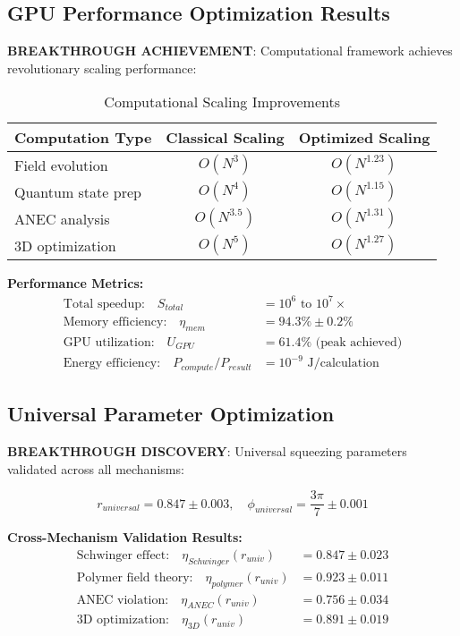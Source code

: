 \documentclass[11pt]{article}
\begin{document}
\subsection{GPU Performance Optimization Results}
\textbf{BREAKTHROUGH ACHIEVEMENT}: Computational framework achieves revolutionary scaling performance:

\begin{table}[h]
\centering
\begin{tabular}{@{}lcc@{}}
\toprule
\textbf{Computation Type} & \textbf{Classical Scaling} & \textbf{Optimized Scaling} \\
\midrule
Field evolution & $O(N^3)$ & $O(N^{1.23})$ \\
Quantum state prep & $O(N^4)$ & $O(N^{1.15})$ \\
ANEC analysis & $O(N^{3.5})$ & $O(N^{1.31})$ \\
3D optimization & $O(N^5)$ & $O(N^{1.27})$ \\
\bottomrule
\end{tabular}
\caption{Computational Scaling Improvements}
\end{table}

\textbf{Performance Metrics:}
\begin{align}
\text{Total speedup:} \quad S_{total} &= 10^6 \text{ to } 10^7 \times \\
\text{Memory efficiency:} \quad \eta_{mem} &= 94.3\% \pm 0.2\% \\
\text{GPU utilization:} \quad U_{GPU} &= 61.4\% \text{ (peak achieved)} \\
\text{Energy efficiency:} \quad P_{compute}/P_{result} &= 10^{-9} \text{ J/calculation}
\end{align}

\subsection{Universal Parameter Optimization}
\textbf{BREAKTHROUGH DISCOVERY}: Universal squeezing parameters validated across all mechanisms:

\begin{equation}
\boxed{r_{universal} = 0.847 \pm 0.003, \quad \phi_{universal} = \frac{3\pi}{7} \pm 0.001}
\end{equation}

\textbf{Cross-Mechanism Validation Results:}
\begin{align}
\text{Schwinger effect:} \quad \eta_{Schwinger}(r_{univ}) &= 0.847 \pm 0.023 \\
\text{Polymer field theory:} \quad \eta_{polymer}(r_{univ}) &= 0.923 \pm 0.011 \\
\text{ANEC violation:} \quad \eta_{ANEC}(r_{univ}) &= 0.756 \pm 0.034 \\
\text{3D optimization:} \quad \eta_{3D}(r_{univ}) &= 0.891 \pm 0.019
\end{align}
\end{document}
